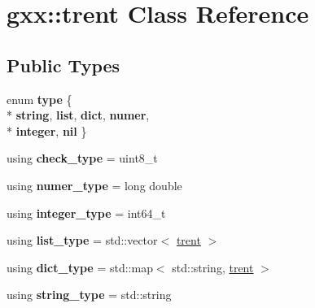 \hypertarget{classgxx_1_1trent}{}\section{gxx\+:\+:trent Class Reference}
\label{classgxx_1_1trent}
\subsection*{Public Types}
\begin{DoxyCompactItemize}
\item 
enum {\bfseries type} \{ \\*
{\bfseries string}, 
{\bfseries list}, 
{\bfseries dict}, 
{\bfseries numer}, 
\\*
{\bfseries integer}, 
{\bfseries nil}
 \}\hypertarget{classgxx_1_1trent_adf4aa7433942d41060e38a9c65edb9ff}{}\label{classgxx_1_1trent_adf4aa7433942d41060e38a9c65edb9ff}

\item 
using {\bfseries check\+\_\+type} = uint8\+\_\+t\hypertarget{classgxx_1_1trent_a37540c02f040b22dd82c517d3e29c0ca}{}\label{classgxx_1_1trent_a37540c02f040b22dd82c517d3e29c0ca}

\item 
using {\bfseries numer\+\_\+type} = long double\hypertarget{classgxx_1_1trent_abd2fc4db1bdd0a83cb04c7ecd69e7909}{}\label{classgxx_1_1trent_abd2fc4db1bdd0a83cb04c7ecd69e7909}

\item 
using {\bfseries integer\+\_\+type} = int64\+\_\+t\hypertarget{classgxx_1_1trent_a1975031e4a1d5fc158ddf0f2cfbc46bb}{}\label{classgxx_1_1trent_a1975031e4a1d5fc158ddf0f2cfbc46bb}

\item 
using {\bfseries list\+\_\+type} = std\+::vector$<$ \hyperlink{classgxx_1_1trent}{trent} $>$\hypertarget{classgxx_1_1trent_a593346513df86992c48ae3b94d843f2d}{}\label{classgxx_1_1trent_a593346513df86992c48ae3b94d843f2d}

\item 
using {\bfseries dict\+\_\+type} = std\+::map$<$ std\+::string, \hyperlink{classgxx_1_1trent}{trent} $>$\hypertarget{classgxx_1_1trent_aeb1872224120aad8c747f7c78f35d1ff}{}\label{classgxx_1_1trent_aeb1872224120aad8c747f7c78f35d1ff}

\item 
using {\bfseries string\+\_\+type} = std\+::string\hypertarget{classgxx_1_1trent_a918582f1681020ce07fb5295495f6ded}{}\label{classgxx_1_1trent_a918582f1681020ce07fb5295495f6ded}

\end{DoxyCompactItemize}
